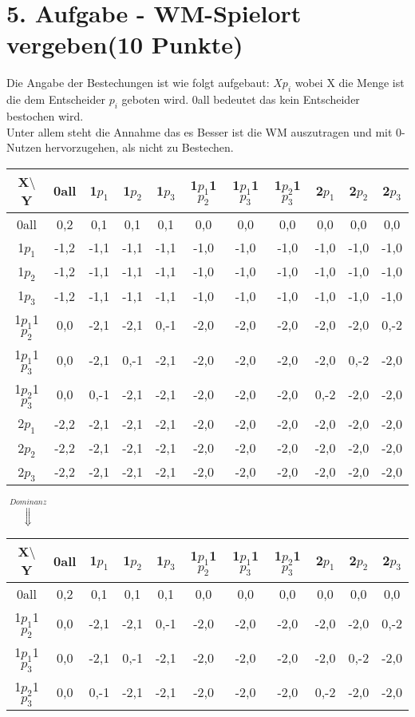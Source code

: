 \documentclass[a4paper, 11pt]{article}
\begin{document}
\section*{5. Aufgabe - WM-Spielort vergeben\hfill {\small (10 Punkte)}}

Die Angabe der Bestechungen ist wie folgt aufgebaut: $Xp_i$ wobei X die Menge ist die dem Entscheider $p_i$ geboten wird. 0all bedeutet das kein Entscheider bestochen wird.\\
Unter allem steht die Annahme das es Besser ist die WM auszutragen und mit 0-Nutzen hervorzugehen, als nicht zu Bestechen. \\
\begin{tabular}{c | cccccccccc}
	X$\setminus$ Y & 0all & 1$p_1$ & 1$p_2$ & 1$p_3$ & 1$p_1$1$p_2$ & 1$p_1$1$p_3$ & 1$p_2$1$p_3$ & 2$p_1$ & 2$p_2$ & 2$p_3$\\ \hline
	0all & 0,2 & 0,1 & 0,1 & 0,1 & 0,0 & 0,0 & 0,0 & 0,0 & 0,0 & 0,0\\
	1$p_1$ & -1,2 & -1,1 & -1,1 & -1,1 & -1,0 & -1,0 & -1,0 & -1,0 & -1,0 & -1,0\\
	1$p_2$ & -1,2 & -1,1 & -1,1 & -1,1 & -1,0 & -1,0 & -1,0 & -1,0 & -1,0 & -1,0\\
	1$p_3$ & -1,2 & -1,1 & -1,1 & -1,1 & -1,0 & -1,0 & -1,0 & -1,0 & -1,0 & -1,0\\
	1$p_1$1$p_2$ & 0,0 & -2,1 & -2,1 & 0,-1 & -2,0 & -2,0 & -2,0 & -2,0 & -2,0 & 0,-2\\
	1$p_1$1$p_3$ & 0,0 & -2,1 & 0,-1 & -2,1 & -2,0 & -2,0 & -2,0 & -2,0 & 0,-2 & -2,0\\
	1$p_2$1$p_3$ & 0,0 & 0,-1 & -2,1 & -2,1 & -2,0 & -2,0 & -2,0 & 0,-2 & -2,0 & -2,0\\
	2$p_1$& -2,2 & -2,1 & -2,1 & -2,1 & -2,0 & -2,0 & -2,0  & -2,0 & -2,0 & -2,0\\
	2$p_2$& -2,2 & -2,1 & -2,1 & -2,1 & -2,0 & -2,0 & -2,0  & -2,0 & -2,0 & -2,0\\
	2$p_3$& -2,2 & -2,1 & -2,1 & -2,1 & -2,0 & -2,0 & -2,0  & -2,0 & -2,0 & -2,0\\
\end{tabular}
\begin{center}
{\huge $\overset{Dominanz}{\Downarrow}$}
\end{center}
\begin{tabular}{c | cccccccccc}
	X$\setminus$ Y & 0all & 1$p_1$ & 1$p_2$ & 1$p_3$ & 1$p_1$1$p_2$ & 1$p_1$1$p_3$ & 1$p_2$1$p_3$ & 2$p_1$ & 2$p_2$ & 2$p_3$\\ \hline
	0all & 0,2 & 0,1 & 0,1 & 0,1 & 0,0 & 0,0 & 0,0 & 0,0 & 0,0 & 0,0\\
	1$p_1$1$p_2$ & 0,0 & -2,1 & -2,1 & 0,-1 & -2,0 & -2,0 & -2,0 & -2,0 & -2,0 & 0,-2\\
	1$p_1$1$p_3$ & 0,0 & -2,1 & 0,-1 & -2,1 & -2,0 & -2,0 & -2,0 & -2,0 & 0,-2 & -2,0\\
	1$p_2$1$p_3$ & 0,0 & 0,-1 & -2,1 & -2,1 & -2,0 & -2,0 & -2,0 & 0,-2 & -2,0 & -2,0\\
\end{tabular}
\end{document}
